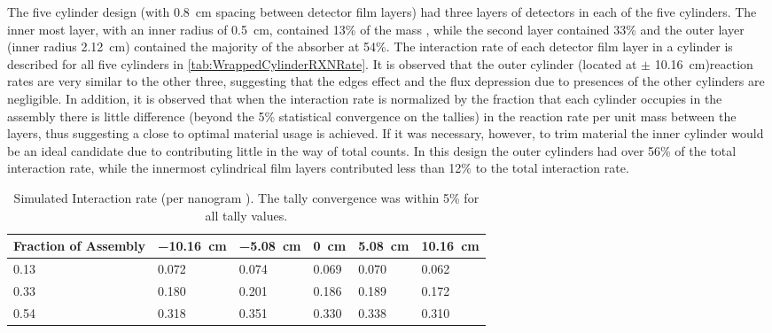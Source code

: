 The five cylinder design (with \SI{0.8}{\cm} spacing between detector film layers) had three layers of detectors in each of the five cylinders.
The inner most layer, with an inner radius of \SI{0.5}{\cm}, contained 13\% of the mass , while the second layer contained 33\%  and the outer layer (inner radius \SI{2.12}{\cm}) contained the majority of the absorber at 54\%.
The interaction rate of each detector film layer in a cylinder is described for all five cylinders in \autoref{tab:WrappedCylinderRXNRate}.
It is observed that the outer cylinder (located at $\pm$ \SI{10.16}{\cm})reaction rates are very similar to the other three, suggesting that the edges effect and the flux depression due to presences of the other cylinders are negligible.
In addition, it is observed that when the interaction rate is normalized by the fraction that each cylinder occupies in the assembly there is little difference (beyond the 5\% statistical convergence on the tallies) in the reaction rate per unit mass between the layers, thus suggesting a close to optimal material usage is achieved.
If it was necessary, however, to trim material the inner cylinder would be an ideal candidate due to contributing little in the way of total counts.
In this design the outer cylinders had over 56\% of the total interaction rate, while the innermost cylindrical film layers contributed less than 12\% to the total interaction rate.
\begin{table}
	\caption[Neutron Interactions per Layer in Cylinder]{Simulated Interaction rate (per nanogram ). The tally convergence was within 5\% for all tally values.}
	\label{tab:WrappedCylinderRXNRate}
	\begin{tabular}{m{4cm} | m{2cm} m{1.75cm} m{1.5cm} m{1.5cm} m{1.5cm}}
		\toprule
		Fraction of Assembly & \SI{-10.16}{\cm} & \SI{-5.08}{\cm} & \SI{0}{\cm} & \SI{5.08}{\cm} & \SI{10.16}{\cm}\\
		\midrule
		0.13 & 0.072 & 0.074 & 0.069 & 0.070 & 0.062 \\
		0.33	& 0.180 & 0.201 & 0.186 & 0.189 & 0.172 \\
		0.54	& 0.318 & 0.351 & 0.330 & 0.338 & 0.310 \\
		\bottomrule
	\end{tabular}
\end{table}
